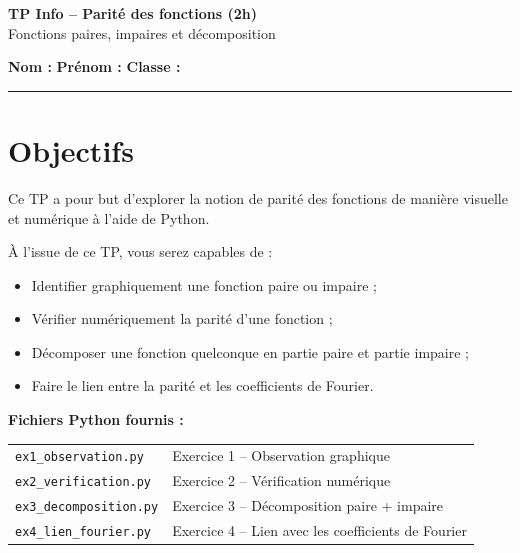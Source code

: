 \documentclass[12pt,a4paper]{article}
\begin{document}
\thispagestyle{fancy}

\begin{center}
    {\LARGE \textbf{TP Info -- Parité des fonctions (2h) }}\\[4pt]
    {\large Fonctions paires, impaires et décomposition}\\[4pt]

\end{center}



\noindent\textbf{Nom :} \dotfill \quad \textbf{Prénom :} \dotfill \quad \textbf{Classe :} \makebox[3cm]{\dotfill}

\medskip

\hrule

\medskip

\section*{Objectifs}

Ce TP a pour but d'explorer la notion de parité des fonctions de manière visuelle et numérique à l'aide de Python.

À l'issue de ce TP, vous serez capables de :
\begin{itemize}
    \item Identifier graphiquement une fonction paire ou impaire ;
    \item Vérifier numériquement la parité d'une fonction ;
    \item Décomposer une fonction quelconque en partie paire et partie impaire ;
    \item Faire le lien entre la parité et les coefficients de Fourier.
\end{itemize}

\begin{fichierbox}
\textbf{Fichiers Python fournis :}\\[4pt]
\begin{tabular}{ll}
    \texttt{ex1\_observation.py}   & Exercice 1 -- Observation graphique \\
    \texttt{ex2\_verification.py}  & Exercice 2 -- Vérification numérique \\
    \texttt{ex3\_decomposition.py} & Exercice 3 -- Décomposition paire + impaire \\
    \texttt{ex4\_lien\_fourier.py} & Exercice 4 -- Lien avec les coefficients de Fourier \\
\end{tabular}
\end{fichierbox}
\end{document}
